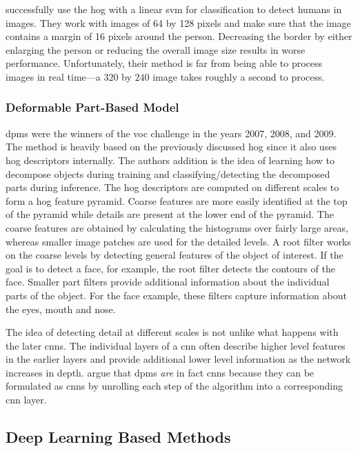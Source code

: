 \documentclass[draft,final]{vutinfth} %
\begin{document}
\textcite{dalal2005} successfully use the \gls{hog} with a linear
\gls{svm} for classification to detect humans in images. They work
with images of 64 by 128 pixels and make sure that the image contains
a margin of 16 pixels around the person. Decreasing the border by
either enlarging the person or reducing the overall image size results
in worse performance. Unfortunately, their method is far from being
able to process images in real time—a $320$ by $240$ image takes
roughly a second to process.

\subsubsection{Deformable Part-Based Model}
\label{sssec:obj-dpm}

\glspl{dpm} \cite{felzenszwalb2008a} were the winners of the \gls{voc}
challenge in the years 2007, 2008, and 2009. The method is heavily
based on the previously discussed \gls{hog} since it also uses
\gls{hog} descriptors internally. The authors addition is the idea of
learning how to decompose objects during training and
classifying/detecting the decomposed parts during inference. The
\gls{hog} descriptors are computed on different scales to form a
\gls{hog} feature pyramid. Coarse features are more easily identified
at the top of the pyramid while details are present at the lower end
of the pyramid. The coarse features are obtained by calculating the
histograms over fairly large areas, whereas smaller image patches are
used for the detailed levels. A root filter works on the coarse levels
by detecting general features of the object of interest. If the goal
is to detect a face, for example, the root filter detects the contours
of the face. Smaller part filters provide additional information about
the individual parts of the object. For the face example, these
filters capture information about the eyes, mouth and nose.

The idea of detecting detail at different scales is not unlike what
happens with the later \glspl{cnn}. The individual layers of a
\gls{cnn} often describe higher level features in the earlier layers
and provide additional lower level information as the network
increases in depth. \textcite{girshick2015} argue that \glspl{dpm}
\emph{are} in fact \glspl{cnn} because they can be formulated as
\glspl{cnn} by unrolling each step of the algorithm into a
corresponding \gls{cnn} layer.

\subsection{Deep Learning Based Methods}
\label{ssec:theory-dl-based}
\end{document}
